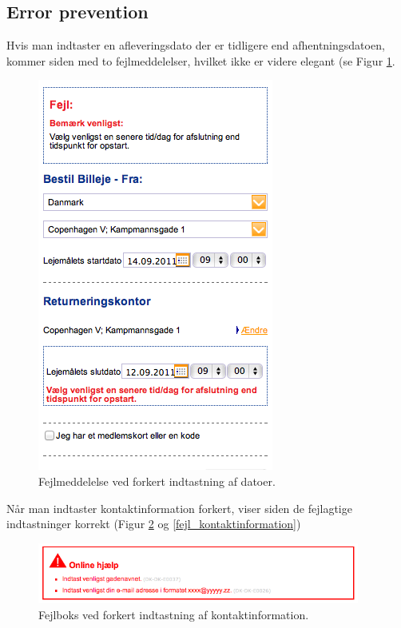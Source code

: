 \documentclass[a4paper]{article}
\begin{document}
\subsection{Error prevention}
Hvis man indtaster en afleveringsdato der er tidligere end afhentningsdatoen,
kommer siden med to fejlmeddelelser, hvilket ikke er videre elegant (se Figur
\ref{fejl_datoer}.

\begin{figure}[htbp]
  \begin{center}
    \includegraphics{6.png}
  \end{center}
  \caption{Fejlmeddelelse ved forkert indtastning af datoer.}
  \label{fejl_datoer}
\end{figure}

Når man indtaster kontaktinformation forkert, viser siden de fejlagtige
indtastninger korrekt (Figur \ref{fejl_boks} og \ref{fejl_kontaktinformation})

\begin{figure}[htbp]
  \begin{center}
    \includegraphics[width=400px]{7.png}
  \end{center}
  \caption{Fejlboks ved forkert indtastning af kontaktinformation.}
  \label{fejl_boks}
\end{figure}
\end{document}

